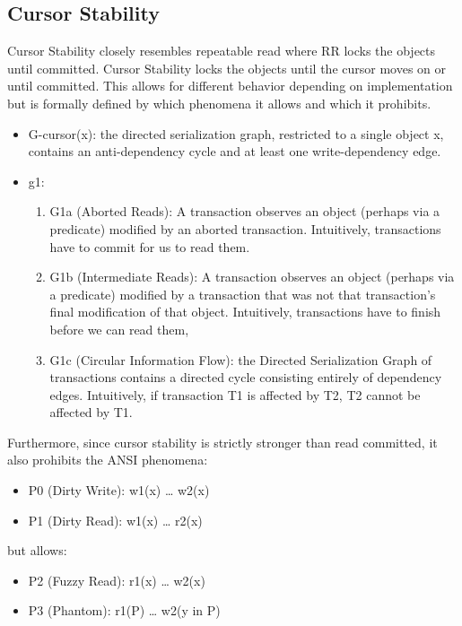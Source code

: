 \documentclass[a4paper,10pt,titlepage]{report}
\begin{document}
\newpage
\subsection{Cursor Stability}
Cursor Stability closely resembles repeatable read where RR locks the objects until committed. Cursor Stability locks the objects until the cursor moves on or until committed. This allows for different behavior depending on implementation but is formally defined by which phenomena it allows and which it prohibits. \cite{Adya99weakconsistency}\\
\begin{itemize}
    \item G-cursor(x): the directed serialization graph, restricted to a single object x, contains an anti-dependency cycle and at least one write-dependency edge.
    \item g1:
    \begin{enumerate}
        \item G1a (Aborted Reads): A transaction observes an object (perhaps via a predicate) modified by an aborted transaction. Intuitively, transactions have to commit for us to read them.
        \item G1b (Intermediate Reads): A transaction observes an object (perhaps via a predicate) modified by a transaction that was not that transaction's final modification of that object. Intuitively, transactions have to finish before we can read them,
        \item G1c (Circular Information Flow): the Directed Serialization Graph of transactions contains a directed cycle consisting entirely of dependency edges. Intuitively, if transaction T1 is affected by T2, T2 cannot be affected by T1.
    \end{enumerate}
\end{itemize}
Furthermore, since cursor stability is strictly stronger than read committed, it also prohibits the ANSI phenomena:
\begin{itemize}
    \item P0 (Dirty Write): w1(x) … w2(x)
    \item P1 (Dirty Read): w1(x) … r2(x)
\end{itemize}

but allows:
\begin{itemize}
    \item P2 (Fuzzy Read): r1(x) … w2(x)
    \item P3 (Phantom): r1(P) … w2(y in P)
\end{itemize}
\end{document}
